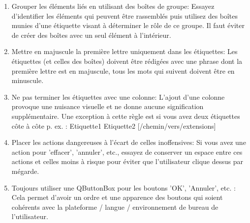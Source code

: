  \begin{enumerate}
 \item Grouper les éléments liés en utilisant des boîtes de groupe:
   Essayez d'identifier les éléments qui peuvent être rassemblés puis utilisez des boîtes munies d'une étiquette visant à déterminer le rôle de ce groupe. Il faut éviter de créer des boîtes avec un seul élément à l'intérieur.
 \item Mettre en majuscule la première lettre uniquement dans les étiquettes:
   Les étiquettes (et celles des boîtes) doivent être rédigées avec une phrase dont la première lettre est en majuscule, tous les mots qui suivent doivent être en minuscule.
 \item Ne pas terminer les étiquettes avec une colonne:
   L'ajout d'une colonne provoque une nuisance visuelle et ne donne aucune signification supplémentaire. Une exception à cette règle est si vous avez deux étiquettes côte à côte p. ex. : Etiquette1  Etiquette2 [/chemin/vers/extensions]
 \item Placer les actions dangereuses à l'écart de celles inoffensives:
   Si vous avez une action pour 'effacer', 'annuler', etc., essayez de conserver un espace entre ces actions et celles moins à risque pour éviter que l'utilisateur clique dessus par mégarde.
 \item Toujours utiliser une QButtonBox pour les boutons 'OK', 'Annuler', etc. :
   Cela permet d'avoir un ordre et une apparence des boutons qui soient cohérents avec la plateforme / langue / environnement de bureau de l'utilisateur.
 \end{enumerate}
